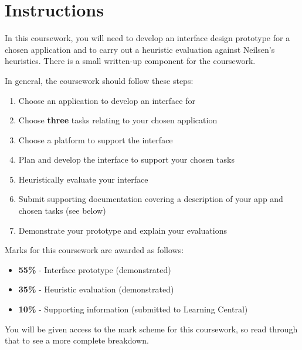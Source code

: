 \documentclass[11pt,a4paper]{report}
\begin{document}
\section*{Instructions}

In this coursework, you will need to develop an interface design prototype for a chosen application and to carry out a heuristic evaluation against Neilsen's heuristics. There is a small written-up component for the coursework.

In general, the coursework should follow these steps:
\begin{enumerate}
    \item Choose an application to develop an interface for
    \item Choose \textbf{three} tasks relating to your chosen application
    \item Choose a platform to support the interface
    \item Plan and develop the interface to support your chosen tasks
    \item Heuristically evaluate your interface
    \item Submit supporting documentation covering a description of your app and chosen tasks (see below)
    \item Demonstrate your prototype and explain your evaluations
\end{enumerate} 
Marks for this coursework are awarded as follows:
\begin{itemize}
    \item \textbf{55\%} - Interface prototype (demonstrated)
    \item \textbf{35\%} - Heuristic evaluation (demonstrated)
    \item \textbf{10\%} - Supporting information (submitted to Learning Central)
\end{itemize}
You will be given access to the mark scheme for this coursework, so read through that to see a more complete breakdown.
\end{document}
